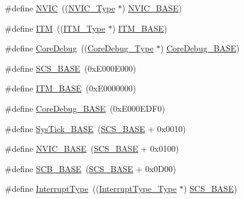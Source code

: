 \begin{DoxyCompactItemize}
\item 
\#define \hyperlink{group___c_m_s_i_s___c_m3__core__register_gac8e97e8ce56ae9f57da1363a937f8a17}{N\-V\-I\-C}~((\hyperlink{struct_n_v_i_c___type}{N\-V\-I\-C\-\_\-\-Type} $\ast$)          \hyperlink{group___c_m_s_i_s__core__register_gaa0288691785a5f868238e0468b39523d}{N\-V\-I\-C\-\_\-\-B\-A\-S\-E})
\item 
\#define \hyperlink{group___c_m_s_i_s___c_m3__core__register_gabae7cdf882def602cb787bb039ff6a43}{I\-T\-M}~((\hyperlink{struct_i_t_m___type}{I\-T\-M\-\_\-\-Type} $\ast$)           \hyperlink{group___c_m_s_i_s__core__register_gadd76251e412a195ec0a8f47227a8359e}{I\-T\-M\-\_\-\-B\-A\-S\-E})
\item 
\#define \hyperlink{group___c_m_s_i_s___c_m3__core__register_gab6e30a2b802d9021619dbb0be7f5d63d}{Core\-Debug}~((\hyperlink{struct_core_debug___type}{Core\-Debug\-\_\-\-Type} $\ast$)     \hyperlink{group___c_m_s_i_s__core__register_ga680604dbcda9e9b31a1639fcffe5230b}{Core\-Debug\-\_\-\-B\-A\-S\-E})
\item 
\#define \hyperlink{group___c_m_s_i_s___c_m3__core__register_ga3c14ed93192c8d9143322bbf77ebf770}{S\-C\-S\-\_\-\-B\-A\-S\-E}~(0x\-E000\-E000)
\item 
\#define \hyperlink{group___c_m_s_i_s___c_m3__core__register_gadd76251e412a195ec0a8f47227a8359e}{I\-T\-M\-\_\-\-B\-A\-S\-E}~(0x\-E0000000)
\item 
\#define \hyperlink{group___c_m_s_i_s___c_m3__core__register_ga680604dbcda9e9b31a1639fcffe5230b}{Core\-Debug\-\_\-\-B\-A\-S\-E}~(0x\-E000\-E\-D\-F0)
\item 
\#define \hyperlink{group___c_m_s_i_s___c_m3__core__register_ga58effaac0b93006b756d33209e814646}{Sys\-Tick\-\_\-\-B\-A\-S\-E}~(\hyperlink{group___c_m_s_i_s__core__register_ga3c14ed93192c8d9143322bbf77ebf770}{S\-C\-S\-\_\-\-B\-A\-S\-E} +  0x0010)
\item 
\#define \hyperlink{group___c_m_s_i_s___c_m3__core__register_gaa0288691785a5f868238e0468b39523d}{N\-V\-I\-C\-\_\-\-B\-A\-S\-E}~(\hyperlink{group___c_m_s_i_s__core__register_ga3c14ed93192c8d9143322bbf77ebf770}{S\-C\-S\-\_\-\-B\-A\-S\-E} +  0x0100)
\item 
\#define \hyperlink{group___c_m_s_i_s___c_m3__core__register_gad55a7ddb8d4b2398b0c1cfec76c0d9fd}{S\-C\-B\-\_\-\-B\-A\-S\-E}~(\hyperlink{group___c_m_s_i_s__core__register_ga3c14ed93192c8d9143322bbf77ebf770}{S\-C\-S\-\_\-\-B\-A\-S\-E} +  0x0\-D00)
\item 
\#define \hyperlink{group___c_m_s_i_s___c_m3__core__register_ga164238adbad56f07c7dd4e912af748dd}{Interrupt\-Type}~((\hyperlink{struct_interrupt_type___type}{Interrupt\-Type\-\_\-\-Type} $\ast$) \hyperlink{group___c_m_s_i_s__core__register_ga3c14ed93192c8d9143322bbf77ebf770}{S\-C\-S\-\_\-\-B\-A\-S\-E})

\end{DoxyCompactItemize}
